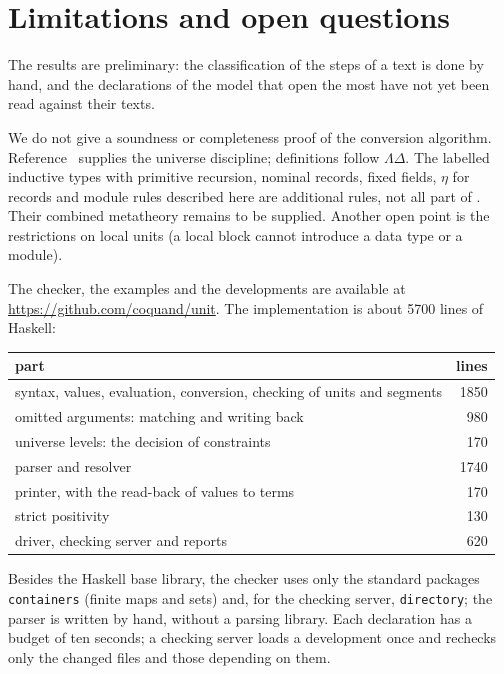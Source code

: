 \documentclass[11pt]{article}
\newcommand{\kw}[1]{\texttt{#1}}
\begin{document}
\section{Limitations and open questions}\label{sec:open}

The results are preliminary: the classification of the steps of a text
is done by hand, and the declarations of the model that open the most
have not yet been read against their texts.

We do not give a soundness or completeness proof of the conversion
algorithm. Reference~\cite{BCDE} supplies the universe discipline;
definitions follow $\Lambda\Delta$. The labelled inductive types with
primitive recursion, nominal records, fixed fields, $\eta$ for records
and module rules described here are additional rules, not all part of
\cite{BCDE}. Their combined metatheory remains to be supplied. Another
open point is the restrictions on local units (a local block cannot
introduce a data type or a module).

The checker, the examples and the developments are available at
\url{https://github.com/coquand/unit}. The implementation is about 5700
lines of Haskell:
\begin{center}
\begin{tabular}{lr}
\toprule
part & lines\\
\midrule
syntax, values, evaluation, conversion, checking of units and segments & 1850\\
omitted arguments: matching and writing back & 980\\
universe levels: the decision of constraints~\cite{BC} & 170\\
parser and resolver & 1740\\
printer, with the read-back of values to terms & 170\\
strict positivity & 130\\
driver, checking server and reports & 620\\
\bottomrule
\end{tabular}
\end{center}
Besides the
Haskell base library, the checker uses only the standard packages
\kw{containers} (finite maps and sets) and, for the checking server,
\kw{directory}; the parser is written by hand, without a parsing
library. Each declaration has a budget of ten seconds; a
checking server loads a development once and rechecks only the changed
files and those depending on them.
\end{document}
